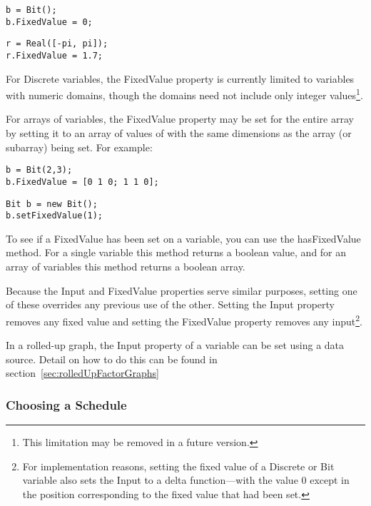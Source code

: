 \begin{lstlisting}
b = Bit();
b.FixedValue = 0;
\end{lstlisting}

\begin{lstlisting}
r = Real([-pi, pi]);
r.FixedValue = 1.7;
\end{lstlisting}

For Discrete variables, the FixedValue property is currently limited to variables with numeric domains, though the domains need not include only integer values\footnote{This limitation may be removed in a future version.}.


\ifmatlab

For arrays of variables, the FixedValue property may be set for the entire array by setting it to an array of values of with the same dimensions as the array (or subarray) being set.  For example:

\begin{lstlisting}
b = Bit(2,3);
b.FixedValue = [0 1 0; 1 1 0];
\end{lstlisting}

\fi

\ifjava
\begin{lstlisting}
Bit b = new Bit();
b.setFixedValue(1);
\end{lstlisting}
\fi

To see if a FixedValue has been set on a variable, you can use the hasFixedValue method.  \ifmatlab For a single variable this method returns a boolean value, and for an array of variables this method returns a boolean array. \fi

Because the Input and FixedValue properties serve similar purposes, setting one of these overrides any previous use of the other.  Setting the Input property removes any fixed value and setting the FixedValue property removes any input\footnote{For implementation reasons, setting the fixed value of a Discrete or Bit variable also sets the Input to a delta function---with the value 0 except in the position corresponding to the fixed value that had been set.}.



In a rolled-up graph, the Input property of a variable can be set using a data source.  Detail on how to do this can be found in section~\ref{sec:rolledUpFactorGraphs}



\subsubsection{Choosing a Schedule}

